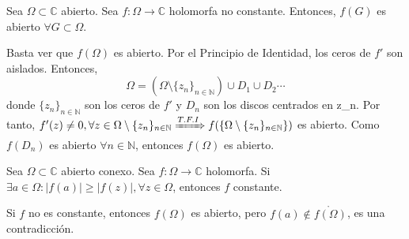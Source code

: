 \begin{theo}
  Sea $\Omega \subset \mathbb{C}$ abierto. Sea $f : \Omega \to \mathbb{C}$ holomorfa no constante. Entonces, $f(G)$ es abierto $\forall G \subset \Omega$.
\end{theo}

\begin{dem}
  Basta ver que $f(\Omega)$ es abierto. Por el Principio de Identidad, los ceros de $f'$ son aislados. Entonces,
  \[ 
    \Omega = (\Omega \setminus \{ z_{n} \}_{n \in \mathbb{N}}) \cup D_{1} \cup D_{2} \cdots 
  \] 
  donde $\{ z_{n} \}_{n \in \mathbb{N}}$ son los ceros de $f'$ y $D_{n}$ son los discos centrados en z_n. Por tanto, $f'(z) \neq 0, \forall z \in \Omega \setminus \{ z_{n} \}_{n \in \mathbb{N}} \xRightarrow[]{ T.F.I } f(\{ \Omega \setminus \{ z_{n} \}_{n \in \mathbb{N}} \})$ es abierto. Como $f(D_{n})$ es abierto $\forall n \in \mathbb{N}$, entonces $f(\Omega)$ es abierto.
\end{dem}

\begin{theo}
  Sea $\Omega \subset \mathbb{C}$ abierto conexo. Sea $f : \Omega \to \mathbb{C}$ holomorfa. Si $\exists a \in \Omega : | f(a) | \geq | f(z) |, \forall z \in \Omega$, entonces $f$ constante.
\end{theo}

\begin{dem}
  Si $f$ no es constante, entonces $f(\Omega)$ es abierto, pero $f(a) \not \in \mathring{f(\Omega)}$, es una contradicción.
\end{dem}
